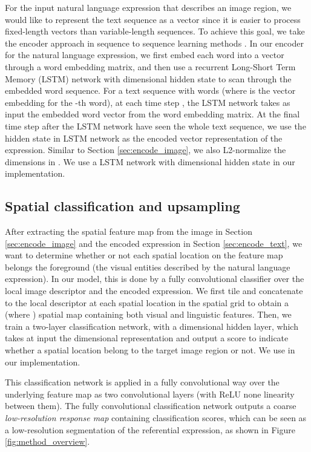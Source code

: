 \documentclass[runningheads]{llncs}
\begin{document}
For the input natural language expression that describes an image region, we would like to represent the text sequence as a vector since it is easier to process fixed-length vectors than variable-length sequences. To achieve this goal, we take the encoder approach in sequence to sequence learning methods \cite{sutskever2014sequence,cho2014properties}. In our encoder for the natural language expression, we first embed each word into a vector through a word embedding matrix, and then use a recurrent Long-Short Term Memory (LSTM) \cite{hochreiter1997long} network with  dimensional hidden state to scan through the embedded word sequence. For a text sequence  with  words (where  is the vector embedding for the -th word), at each time step , the LSTM network takes as input the embedded word vector  from the word embedding matrix. At the final time step  after the LSTM network have seen the whole text sequence, we use the hidden state  in LSTM network as the encoded vector representation of the expression. Similar to Section \ref{sec:encode_image}, we also L2-normalize the  dimensions in . We use a LSTM network with  dimensional hidden state in our implementation.

\subsection{Spatial classification and upsampling}\label{sec:cls_upsample}

After extracting the spatial feature map from the image in Section \ref{sec:encode_image} and the encoded expression  in Section \ref{sec:encode_text}, we want to determine whether or not each spatial location on the feature map belongs the foreground (the visual entities described by the natural language expression). In our model, this is done by a fully convolutional classifier over the local image descriptor and the encoded expression.
We first tile and concatenate  to the local descriptor at each spatial location in the spatial grid to obtain a  (where ) spatial map containing both visual and linguistic features. Then, we train a two-layer classification network, with a  dimensional hidden layer, which takes at input the  dimensional representation and output a score to indicate whether a spatial location belong to the target image region or not. We use  in our implementation.

This classification network is applied in a fully convolutional way over the underlying  feature map as two  convolutional layers (with ReLU none linearity between them). The fully convolutional classification network outputs a  coarse \textit{low-resolution response map} containing classification scores, which can be seen as a low-resolution segmentation of the referential expression, as shown in Figure \ref{fig:method_overview}.
\end{document}
